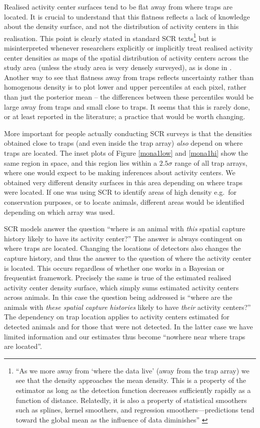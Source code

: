 \documentclass[10pt,a4paper]{article}
\begin{document}
Realised activity center surfaces tend to be flat away from where traps are located. It is crucial to understand that this flatness reflects a lack of knowledge about the density surface, and not the distribution of activity centers in this realisation. This point is clearly stated in standard SCR texts\footnote{``As we more away from `where the data live' (away from the trap array) we see that the density approaches the mean density. This is a property of the estimator as long as the detection function decreases sufficiently rapidly as a function of distance. Relatedly, it is also a property of statistical smoothers such as splines, kernel smoothers, and regression smoothers---predictions tend toward the global mean as the influence of data diminishes'' \citep[p165-166][]{Royle+al:13a}} but is misinterpreted whenever researchers explicitly or implicitly treat realised activity center densities as maps of the spatial distribution of activity centers across the study area (unless the study area is very densely surveyed), as is done in \cite{Alexander+al:15}. Another way to see that flatness away from traps reflects uncertainty rather than homogenous density is to plot lower and upper percentiles at each pixel, rather than just the posterior mean -- the differences between these percentiles would be large away from traps and small close to traps. It seems that this is rarely done, or at least reported in the literature; a practice that would be worth changing. 

More important for people actually conducting SCR surveys is that the densities obtained close to traps (and even inside the trap array) {\it also} depend on where traps are located. The inset plots of Figure \ref{mona1low} and \ref{mona1hi} show the same region in space, and this region lies within a $2.5\sigma$ range of all trap arrays, where one would expect to be making inferences about activity centers. We obtained very different density surfaces in this area depending on where traps were located. If one was using SCR to identify areas of high density e.g.\ for conservation purposes, or to locate animals, different areas would be identified depending on which array was used. 

SCR models answer the question ``where is an animal with {\it this} spatial capture history likely to have its activity center?'' The answer is always contingent on where traps are located. Changing the locations of detectors also changes the capture history, and thus the answer to the question of where the activity center is located. This occurs regardless of whether one works in a Bayesian or frequentist framework. Precisely the same is true of the estimated realised activity center density surface, which simply sums estimated activity centers across animals. In this case the question being addressed is ``where are the animals with {\it these spatial capture histories} likely to have {\it their} activity centers?'' The dependency on trap location applies to activity centers estimated for detected animals and for those that were not detected. In the latter case we have limited information and our estimates thus become ``nowhere near where traps are located''. 
\end{document}
